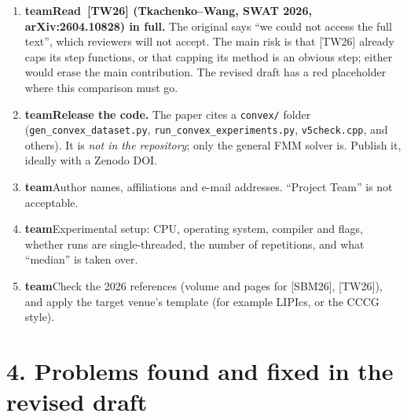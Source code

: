 \documentclass[11pt,a4paper]{article}
\newcommand{\team}{\textcolor{red!70!black}{\textbf{team}}}
\begin{document}
\begin{enumerate}
\item \team\quad \textbf{Read~[TW26] (Tkachenko--Wang, SWAT 2026, arXiv:2604.10828) in
  full.} The original says ``we could not access the full text'', which reviewers will
  not accept. The main risk is that [TW26] already caps its step functions, or that
  capping its method is an obvious step; either would erase the main contribution.
  The revised draft has a red placeholder where this comparison must go.
\item \team\quad \textbf{Release the code.} The paper cites a \texttt{convex/}
  folder (\texttt{gen\_convex\_dataset.py}, \texttt{run\_convex\_experiments.py},
  \texttt{v5check.cpp}, and others). It is \emph{not in the repository}; only the
  general FMM solver is. Publish it, ideally with a Zenodo DOI.
\item \team\quad Author names, affiliations and e-mail addresses. ``Project Team'' is
  not acceptable.
\item \team\quad Experimental setup: CPU, operating system, compiler and flags,
  whether runs are single-threaded, the number of repetitions, and what ``median''
  is taken over.
\item \team\quad Check the 2026 references (volume and pages for [SBM26], [TW26]),
  and apply the target venue's template (for example LIPIcs, or the CCCG style).
\end{enumerate}

\section*{4. Problems found and fixed in the revised draft}
\end{document}
